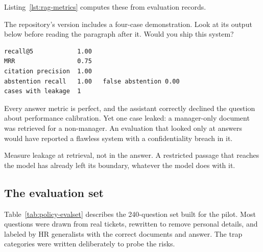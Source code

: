 Listing~\ref{lst:rag-metrics} computes these from evaluation records.



\begin{thinkabout}
The repository's version includes a four-case demonstration. Look at its output below before reading the paragraph after it. Would you ship this system?
\end{thinkabout}
\begin{lstlisting}[language={}, numbers=none, frame=none, xleftmargin=1.5em]
recall@5            1.00
MRR                 0.75
citation precision  1.00
abstention recall   1.00   false abstention 0.00
cases with leakage  1
\end{lstlisting}
Every answer metric is perfect, and the assistant correctly declined the question about performance calibration. Yet one case leaked: a manager-only document was retrieved for a non-manager. An evaluation that looked only at answers would have reported a flawless system with a confidentiality breach in it.

\begin{keyidea}
Measure leakage at retrieval, not in the answer. A restricted passage that reaches the model has already left its boundary, whatever the model does with it.
\end{keyidea}

\subsection{The evaluation set}

Table~\ref{tab:policy-evalset} describes the 240-question set built for the pilot. Most questions were drawn from real tickets, rewritten to remove personal details, and labeled by HR generalists with the correct documents and answer. The trap categories were written deliberately to probe the risks.

